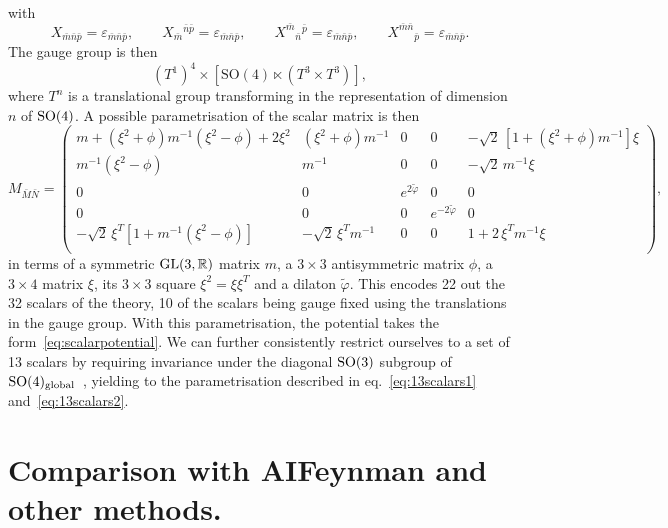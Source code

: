 \documentclass[11pt,a4paper]{article}
\newcommand{\bM}{{\bar{M}}}
\newcommand{\bN}{{\bar{N}}}
\begin{document}
with 
%
\begin{equation}
	X_{\bar m\bar n \bar p} = \varepsilon_{\bar m \bar n \bar p},		\qquad
	X_{\bar m}{}^{\bar n \bar p} = \varepsilon_{\bar m \bar n \bar p},	\qquad
	X^{\bar m}{}_{\bar n}{}^{\bar p} = \varepsilon_{\bar m \bar n \bar p},	\qquad
	X^{\bar m\bar n}{}_{\bar p} = \varepsilon_{\bar m \bar n \bar p}.
\end{equation}
The gauge group is then
\begin{equation}
	(T^1)^4\times[\text{SO}(4)\ltimes(T^3\times T^3)],
\end{equation}
where $T^{n}$ is a translational group transforming in the representation of dimension $n$ of ${\rm SO}(4)$. A possible parametrisation of the scalar matrix is then
\begin{equation}	\label{eq: scalarmatrix}
	M_{\bM\bN}
	=
	\begin{pmatrix}
		m+(\xi^2+\phi)m^{-1}(\xi^2-\phi)+2\xi^2	& 	(\xi^2+\phi)m^{-1}		&	0	&  0  &	-\sqrt2\,[1+(\xi^2+\phi)m^{-1}]\xi	\\
		m^{-1}(\xi^2-\phi)	& 	m^{-1}	&	0  	&  0  &	-\sqrt2\,m^{-1}\xi	\\
		0		&	0		&	e^{2\tilde\varphi}	&	0				&	0		\\
		0		&	0		&	0				&	e^{-2\tilde\varphi}	&	0		\\
		-\sqrt2\,\xi^T[1+m^{-1}(\xi^2-\phi)]	&	-\sqrt2\,\xi^Tm^{-1}	&	0	&	0	&	1+2\,\xi^Tm^{-1}\xi	\\
	\end{pmatrix},
\end{equation}
in terms of a symmetric ${\rm GL}(3,\mathbb{R})$ matrix $m$, a $3\times3$ antisymmetric matrix $\phi$, a $3\times4$ matrix $\xi$, its $3\times 3$ square $\xi^{2} = \xi \xi^{T}$ and a dilaton $\tilde{\varphi}$. This encodes 22 out the 32 scalars of the theory, 10 of the scalars being gauge fixed using the translations in the gauge group. With this parametrisation, the potential takes the form~\eqref{eq:scalarpotential}. We can further consistently restrict ourselves to a set of 13 scalars by requiring invariance under the diagonal ${\rm SO}(3)$ subgroup of ${\rm SO}(4)_{\rm global}$~\cite{Eloy:2021fhc}, yielding to the parametrisation described in eq.~\eqref{eq:13scalars1} and~\eqref{eq:13scalars2}.


\section{Comparison with AIFeynman and other methods.} \label{app:AIFeynman}
\end{document}
